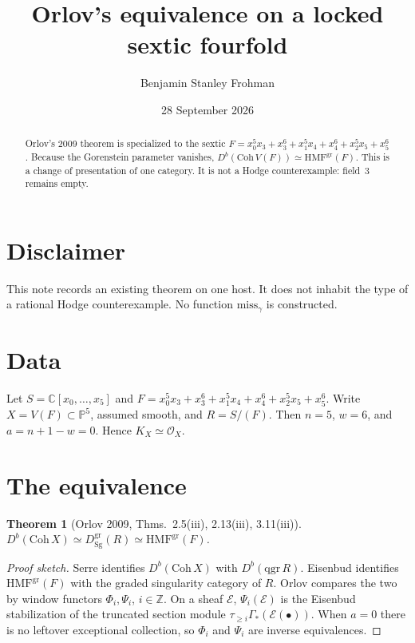 \documentclass[11pt]{amsart}
\title{Orlov's equivalence on a locked sextic fourfold}
\author{Benjamin Stanley Frohman}
\date{28 September 2026}
\newtheorem{theorem}{Theorem}
\newcommand{\CC}{\mathbb{C}}
\newcommand{\PP}{\mathbb{P}}
\begin{document}
\begin{abstract}
Orlov's 2009 theorem is specialized to the sextic
$F=x_0^5x_3+x_3^6+x_1^5x_4+x_4^6+x_2^5x_5+x_5^6$.
Because the Gorenstein parameter vanishes, $D^b(\mathrm{Coh}\,V(F))\simeq \mathrm{HMF}^{\mathrm{gr}}(F)$.
This is a change of presentation of one category. It is not a Hodge counterexample: field~3 remains empty.
\end{abstract}
\maketitle

\section{Disclaimer}
This note records an existing theorem on one host. It does not inhabit the type of a rational Hodge counterexample. No function $\mathrm{miss}_\gamma$ is constructed.

\section{Data}
Let $S=\CC[x_0,\dots,x_5]$ and $F=x_0^5x_3+x_3^6+x_1^5x_4+x_4^6+x_2^5x_5+x_5^6$. Write $X=V(F)\subset\PP^5$, assumed smooth, and $R=S/(F)$. Then $n=5$, $w=6$, and $a=n+1-w=0$. Hence $K_X\simeq\mathcal{O}_X$.

\section{The equivalence}
\begin{theorem}[Orlov 2009, Thms.~2.5(iii), 2.13(iii), 3.11(iii)]
$D^b(\mathrm{Coh}\,X)\simeq D^{\mathrm{gr}}_{\mathrm{Sg}}(R)\simeq \mathrm{HMF}^{\mathrm{gr}}(F)$.
\end{theorem}

\begin{proof}[Proof sketch]
Serre identifies $D^b(\mathrm{Coh}\,X)$ with $D^b(\mathrm{qgr}\,R)$. Eisenbud identifies $\mathrm{HMF}^{\mathrm{gr}}(F)$ with the graded singularity category of $R$. Orlov compares the two by window functors $\Phi_i,\Psi_i$, $i\in\mathbb{Z}$. On a sheaf $\mathcal{E}$, $\Psi_i(\mathcal{E})$ is the Eisenbud stabilization of the truncated section module $\tau_{\ge i}\Gamma_*(\mathcal{E}(\bullet))$. When $a=0$ there is no leftover exceptional collection, so $\Phi_i$ and $\Psi_i$ are inverse equivalences.
\end{proof}
\end{document}
